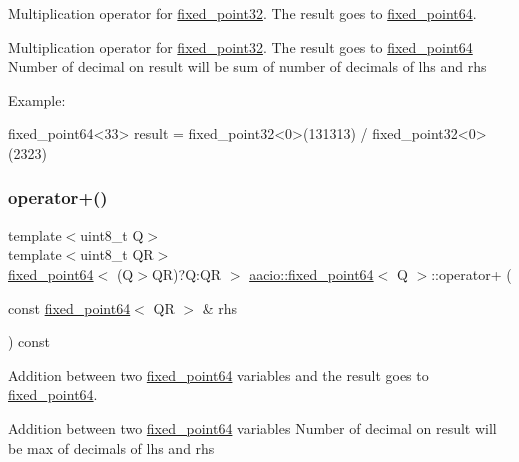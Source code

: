 Multiplication operator for \mbox{\hyperlink{structaacio_1_1fixed__point32}{fixed\+\_\+point32}}. The result goes to \mbox{\hyperlink{structaacio_1_1fixed__point64}{fixed\+\_\+point64}}. 

Multiplication operator for \mbox{\hyperlink{structaacio_1_1fixed__point32}{fixed\+\_\+point32}}. The result goes to \mbox{\hyperlink{structaacio_1_1fixed__point64}{fixed\+\_\+point64}} Number of decimal on result will be sum of number of decimals of lhs and rhs

Example\+: 
\begin{DoxyCode}
fixed\_point64<33> result = fixed\_point32<0>(131313) / fixed\_point32<0>(2323)
\end{DoxyCode}
 \mbox{\label{group__fixedpoint_ga83a7a788aa4fd2cec63111176dd9332f}} 
\subsubsection{\texorpdfstring{operator+()}{operator+()}\hspace{0.1cm}{\footnotesize\ttfamily [1/2]}}
{\footnotesize\ttfamily template$<$uint8\+\_\+t Q$>$ \\
template$<$uint8\+\_\+t QR$>$ \\
\mbox{\hyperlink{structaacio_1_1fixed__point64}{fixed\+\_\+point64}}$<$ (Q$>$QR)?Q\+:\+QR $>$ \mbox{\hyperlink{structaacio_1_1fixed__point64}{aacio\+::fixed\+\_\+point64}}$<$ Q $>$\+::operator+ (\begin{DoxyParamCaption}\item[{const \mbox{\hyperlink{structaacio_1_1fixed__point64}{fixed\+\_\+point64}}$<$ QR $>$ \&}]{rhs }\end{DoxyParamCaption}) const}



Addition between two \mbox{\hyperlink{structaacio_1_1fixed__point64}{fixed\+\_\+point64}} variables and the result goes to \mbox{\hyperlink{structaacio_1_1fixed__point64}{fixed\+\_\+point64}}. 

Addition between two \mbox{\hyperlink{structaacio_1_1fixed__point64}{fixed\+\_\+point64}} variables Number of decimal on result will be max of decimals of lhs and rhs \mbox{\label{group__fixedpoint_gae544257783a230bb6b33942a19925f6f}} 

